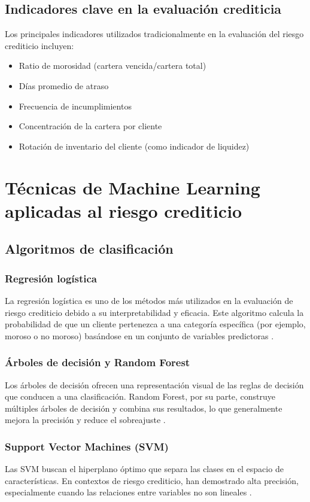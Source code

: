 \subsection{Indicadores clave en la evaluación crediticia}
Los principales indicadores utilizados tradicionalmente en la evaluación del riesgo crediticio incluyen:

\begin{itemize}
    \item Ratio de morosidad (cartera vencida/cartera total)
    \item Días promedio de atraso
    \item Frecuencia de incumplimientos
    \item Concentración de la cartera por cliente
    \item Rotación de inventario del cliente (como indicador de liquidez)
\end{itemize}

\section{Técnicas de Machine Learning aplicadas al riesgo crediticio}
\subsection{Algoritmos de clasificación}
\subsubsection{Regresión logística}
La regresión logística es uno de los métodos más utilizados en la evaluación de riesgo crediticio debido a su interpretabilidad y eficacia. Este algoritmo calcula la probabilidad de que un cliente pertenezca a una categoría específica (por ejemplo, moroso o no moroso) basándose en un conjunto de variables predictoras \citep{baesens2003benchmarking}.

\subsubsection{Árboles de decisión y Random Forest}
Los árboles de decisión ofrecen una representación visual de las reglas de decisión que conducen a una clasificación. Random Forest, por su parte, construye múltiples árboles de decisión y combina sus resultados, lo que generalmente mejora la precisión y reduce el sobreajuste \citep{breiman2001random}.

\subsubsection{Support Vector Machines (SVM)}
Las SVM buscan el hiperplano óptimo que separa las clases en el espacio de características. En contextos de riesgo crediticio, han demostrado alta precisión, especialmente cuando las relaciones entre variables no son lineales \citep{huang2007credit}.


